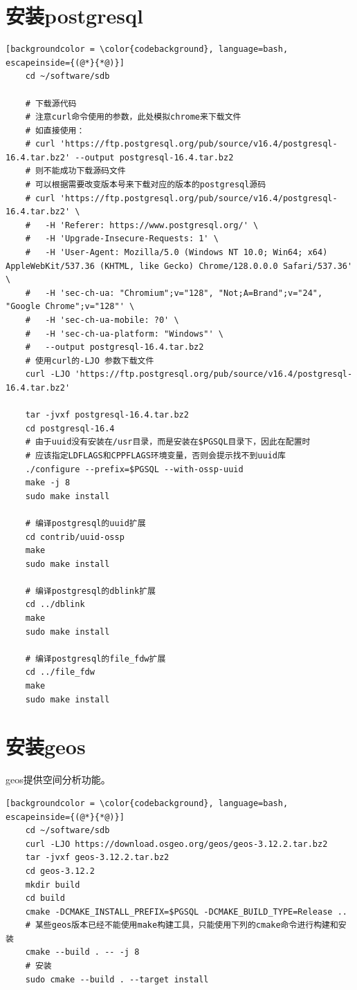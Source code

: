 \section{安装postgresql}
\begin{lstlisting}[backgroundcolor = \color{codebackground}, language=bash, escapeinside={(@*}{*@)}]
	cd ~/software/sdb
	
	# 下载源代码
	# 注意curl命令使用的参数，此处模拟chrome来下载文件
	# 如直接使用：
	# curl 'https://ftp.postgresql.org/pub/source/v16.4/postgresql-16.4.tar.bz2' --output postgresql-16.4.tar.bz2
	# 则不能成功下载源码文件
	# 可以根据需要改变版本号来下载对应的版本的postgresql源码
	# curl 'https://ftp.postgresql.org/pub/source/v16.4/postgresql-16.4.tar.bz2' \
	#	-H 'Referer: https://www.postgresql.org/' \
	#	-H 'Upgrade-Insecure-Requests: 1' \
	#	-H 'User-Agent: Mozilla/5.0 (Windows NT 10.0; Win64; x64) AppleWebKit/537.36 (KHTML, like Gecko) Chrome/128.0.0.0 Safari/537.36' \
	#	-H 'sec-ch-ua: "Chromium";v="128", "Not;A=Brand";v="24", "Google Chrome";v="128"' \
	#	-H 'sec-ch-ua-mobile: ?0' \
	#	-H 'sec-ch-ua-platform: "Windows"' \
	#	--output postgresql-16.4.tar.bz2
	# 使用curl的-LJO 参数下载文件
	curl -LJO 'https://ftp.postgresql.org/pub/source/v16.4/postgresql-16.4.tar.bz2'
	
	tar -jvxf postgresql-16.4.tar.bz2
	cd postgresql-16.4
	# 由于uuid没有安装在/usr目录，而是安装在$PGSQL目录下，因此在配置时
	# 应该指定LDFLAGS和CPPFLAGS环境变量，否则会提示找不到uuid库
	./configure --prefix=$PGSQL --with-ossp-uuid 
	make -j 8
	sudo make install
	
	# 编译postgresql的uuid扩展
	cd contrib/uuid-ossp
	make
	sudo make install
	
	# 编译postgresql的dblink扩展
	cd ../dblink
	make 
	sudo make install
	
	# 编译postgresql的file_fdw扩展
	cd ../file_fdw
	make
	sudo make install
\end{lstlisting}


\section{安装geos}
geos提供空间分析功能。
\begin{lstlisting}[backgroundcolor = \color{codebackground}, language=bash, escapeinside={(@*}{*@)}]
	cd ~/software/sdb
	curl -LJO https://download.osgeo.org/geos/geos-3.12.2.tar.bz2
	tar -jvxf geos-3.12.2.tar.bz2
	cd geos-3.12.2
	mkdir build
	cd build
	cmake -DCMAKE_INSTALL_PREFIX=$PGSQL -DCMAKE_BUILD_TYPE=Release ..
	# 某些geos版本已经不能使用make构建工具，只能使用下列的cmake命令进行构建和安装
	cmake --build . -- -j 8
	# 安装
	sudo cmake --build . --target install 
	
\end{lstlisting}


